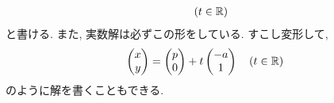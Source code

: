 \begin{example}
\begin{align*}
        \quad (t\in\mathbb{R})
  \end{align*}
  と書ける.  また, 実数解は必ずこの形をしている.
  すこし変形して,
  \begin{align*}
    \begin{pmatrix}x\\y\end{pmatrix}
      =
      \begin{pmatrix}p\\0\end{pmatrix}
        +
        t\begin{pmatrix}-a\\1\end{pmatrix}
        \quad (t\in\mathbb{R})
  \end{align*}
  のように解を書くこともできる.
\end{example}

